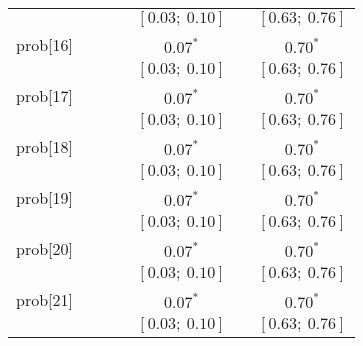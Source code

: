 \begin{table}
\begin{center}
\begin{tabular}{l c c c c c c }
          &                           &                           &                           & $[0.03;\ 0.10]$         &                           & $[0.63;\ 0.76]$       \\
prob[16]  &                           &                           &                           & $0.07^{*}$              &                           & $0.70^{*}$            \\
          &                           &                           &                           & $[0.03;\ 0.10]$         &                           & $[0.63;\ 0.76]$       \\
prob[17]  &                           &                           &                           & $0.07^{*}$              &                           & $0.70^{*}$            \\
          &                           &                           &                           & $[0.03;\ 0.10]$         &                           & $[0.63;\ 0.76]$       \\
prob[18]  &                           &                           &                           & $0.07^{*}$              &                           & $0.70^{*}$            \\
          &                           &                           &                           & $[0.03;\ 0.10]$         &                           & $[0.63;\ 0.76]$       \\
prob[19]  &                           &                           &                           & $0.07^{*}$              &                           & $0.70^{*}$            \\
          &                           &                           &                           & $[0.03;\ 0.10]$         &                           & $[0.63;\ 0.76]$       \\
prob[20]  &                           &                           &                           & $0.07^{*}$              &                           & $0.70^{*}$            \\
          &                           &                           &                           & $[0.03;\ 0.10]$         &                           & $[0.63;\ 0.76]$       \\
prob[21]  &                           &                           &                           & $0.07^{*}$              &                           & $0.70^{*}$            \\
          &                           &                           &                           & $[0.03;\ 0.10]$         &                           & $[0.63;\ 0.76]$       \\

\end{tabular}
\end{center}
\end{table}
